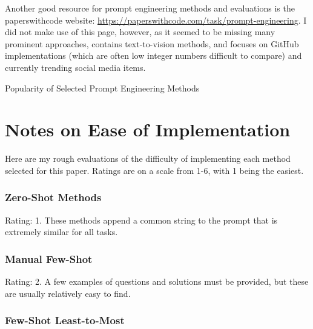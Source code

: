 \documentclass[11pt]{article}
\begin{document}
Another good resource for prompt engineering methods and evaluations is the paperswithcode website: \url{https://paperswithcode.com/task/prompt-engineering}. I did not make use of this page, however, as it seemed to be missing many prominent approaches, contains text-to-vision methods, and focuses on GitHub implementations (which are often low integer numbers difficult to compare) and currently trending social media items.

\begin{landscape}

  \begin{centering}

    \begin{table}[h]
      \caption{Popularity of Selected Prompt Engineering Methods}
      \small
      
      \label{tab:method_pop}
    \end{table}

  \end{centering}

\end{landscape}

\section{Notes on Ease of Implementation}
\label{sec:difficulty}

Here are my rough evaluations of the difficulty of implementing each method selected for this paper. Ratings are on a scale from 1-6, with 1 being the easiest.

\subsubsection*{Zero-Shot Methods}

Rating: 1. These methods append a common string to the prompt that is extremely similar for all tasks.

\subsubsection*{Manual Few-Shot}

Rating: 2. A few examples of questions and solutions must be provided, but these are usually relatively easy to find.

\subsubsection*{Few-Shot Least-to-Most}
\end{document}
